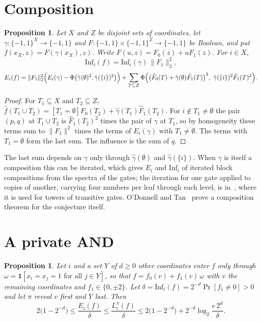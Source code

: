 \documentclass[11pt]{amsart}
\newtheorem{proposition}[theorem]{Proposition}
\theoremstyle{remark}
\newcommand{\Inf}{\mathrm{Inf}}
\begin{document}
\section{Composition}\label{sec:comp}

\begin{proposition}\label{prop:comp}
Let $X$ and $Z$ be disjoint sets of coordinates, let $\gamma\colon\{-1,1\}^X\to\{-1,1\}$ and
$F\colon\{-1,1\}\times\{-1,1\}^Z\to\{-1,1\}$ be Boolean, and put $f(x_X,z)=F(\gamma(x_X),z)$. Write $F(u,z)=F_0(z)+uF_1(z)$. For $i\in X$,
\[
\Inf_i(f)=\Inf_i(\gamma)\,\|F_1\|_2^2,
\]
\[
E_i(f)=\|F_1\|_2^2\Bigl(E_i(\gamma)-\Phi\bigl(\hat\gamma(\emptyset)^2,\hat\gamma(\{i\})^2\bigr)\Bigr)
+\sum_{T\subseteq Z}\Phi\Bigl(\bigl(\hat F_0(T)+\hat\gamma(\emptyset)\hat F_1(T)\bigr)^2,\ \hat\gamma(\{i\})^2\hat F_1(T)^2\Bigr).
\]
\end{proposition}

\begin{proof}
For $T_1\subseteq X$ and $T_2\subseteq Z$, $\hat f(T_1\cup T_2)=[T_1=\emptyset]\hat F_0(T_2)+\hat\gamma(T_1)\hat F_1(T_2)$.
For $i\notin T_1\ne\emptyset$ the pair $(p,q)$ at $T_1\cup T_2$ is $\hat F_1(T_2)^2$ times the pair of $\gamma$ at $T_1$, so by
homogeneity these terms sum to $\|F_1\|^2$ times the terms of $E_i(\gamma)$ with $T_1\ne\emptyset$. The terms with
$T_1=\emptyset$ form the last sum. The influence is the sum of $q$.
\end{proof}

The last sum depends on $\gamma$ only through $\hat\gamma(\emptyset)$ and $\hat\gamma(\{i\})$. When $\gamma$ is itself a composition this
can be iterated, which gives $E_i$ and $\Inf_i$ of iterated block compositions from the spectra of the gates; the
iteration for one gate applied to copies of another, carrying four numbers per leaf through each level, is in~\cite[Section~2]{Shm3}, where
it is used for towers of transitive gates. O'Donnell and Tan~\cite{OT13} prove a composition theorem for the
conjecture itself.

\section{A private AND}\label{sec:private}

\begin{proposition}\label{prop:private}
Let $i$ and a set $Y$ of $d\ge0$ other coordinates enter $f$ only through $\omega=\mathbf 1[x_i=x_j=1\text{ for all }j\in Y]$,
so that $f=f_0(v)+f_1(v)\,\omega$ with $v$ the remaining coordinates and $f_1\in\{0,\pm2\}$. Let $\delta=\Inf_i(f)=2^{-d}\Pr[f_1\ne0]>0$
and let $\pi$ reveal $v$ first and $Y$ last. Then
\[
2\bigl(1-2^{-d}\bigr)\le\frac{E_i(f)}{\delta}\le\frac{L^\pi_i(f)}{\delta}\le2\bigl(1-2^{-d}\bigr)+2^{-d}\log_2\frac{e\,2^d}{\delta}.
\]
\end{proposition}
\end{document}
